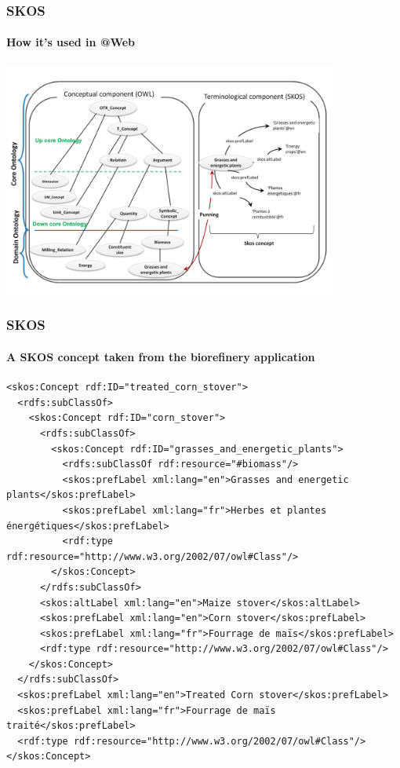 \documentclass{beamer}
\makeatletter
\newcommand{\atweb}{\textbf{@Web}\xspace}
\makeatother
\begin{document}
\begin{frame}
  \frametitle{SKOS}
  \framesubtitle{How it's used in \atweb}

  \begin{center}
    \includegraphics[width=11cm]{termino-ontological-resource.jpg}
  \end{center}
\end{frame}

\begin{frame}[fragile]
  \frametitle{SKOS}
  \framesubtitle{A SKOS concept taken from the biorefinery application}

  \begin{Verbatim}[fontsize=\scriptsize]
<skos:Concept rdf:ID="treated_corn_stover">
  <rdfs:subClassOf>
    <skos:Concept rdf:ID="corn_stover">
      <rdfs:subClassOf>
        <skos:Concept rdf:ID="grasses_and_energetic_plants">
          <rdfs:subClassOf rdf:resource="#biomass"/>
          <skos:prefLabel xml:lang="en">Grasses and energetic plants</skos:prefLabel>
          <skos:prefLabel xml:lang="fr">Herbes et plantes énergétiques</skos:prefLabel>
          <rdf:type rdf:resource="http://www.w3.org/2002/07/owl#Class"/>
        </skos:Concept>
      </rdfs:subClassOf>
      <skos:altLabel xml:lang="en">Maize stover</skos:altLabel>
      <skos:prefLabel xml:lang="en">Corn stover</skos:prefLabel>
      <skos:prefLabel xml:lang="fr">Fourrage de maïs</skos:prefLabel>
      <rdf:type rdf:resource="http://www.w3.org/2002/07/owl#Class"/>
    </skos:Concept>
  </rdfs:subClassOf>
  <skos:prefLabel xml:lang="en">Treated Corn stover</skos:prefLabel>
  <skos:prefLabel xml:lang="fr">Fourrage de maïs traité</skos:prefLabel>
  <rdf:type rdf:resource="http://www.w3.org/2002/07/owl#Class"/>
</skos:Concept>
  \end{Verbatim}
\end{frame}
\end{document}
